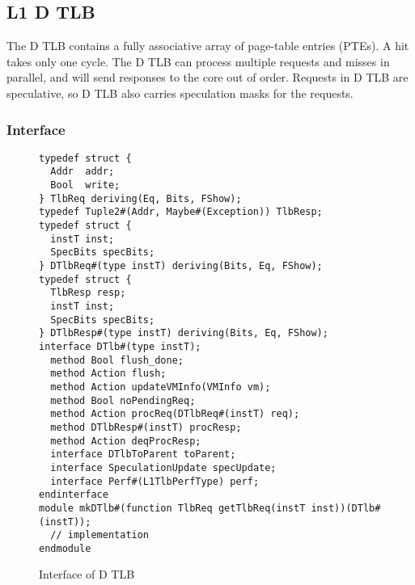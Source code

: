 \subsection{L1 D TLB}\label{sec:d-tlb}
The D TLB contains a fully associative array of page-table entries (PTEs).
A hit takes only one cycle.
The D TLB can process multiple requests and misses in parallel, and will send responses to the core out of order.
Requests in D TLB are speculative, so D TLB also carries speculation masks for the requests.

\subsubsection{Interface}

\begin{figure}
\begin{lstlisting}[caption={}]
typedef struct {
  Addr  addr;
  Bool  write;
} TlbReq deriving(Eq, Bits, FShow);
typedef Tuple2#(Addr, Maybe#(Exception)) TlbResp;
typedef struct {
  instT inst;
  SpecBits specBits;
} DTlbReq#(type instT) deriving(Bits, Eq, FShow);
typedef struct {
  TlbResp resp;
  instT inst;
  SpecBits specBits;
} DTlbResp#(type instT) deriving(Bits, Eq, FShow);
interface DTlb#(type instT);
  method Bool flush_done;
  method Action flush;
  method Action updateVMInfo(VMInfo vm);
  method Bool noPendingReq;
  method Action procReq(DTlbReq#(instT) req);
  method DTlbResp#(instT) procResp;
  method Action deqProcResp;
  interface DTlbToParent toParent;
  interface SpeculationUpdate specUpdate;
  interface Perf#(L1TlbPerfType) perf;
endinterface
module mkDTlb#(function TlbReq getTlbReq(instT inst))(DTlb#(instT));
  // implementation
endmodule
\end{lstlisting}
\caption{Interface of D TLB}\label{fig:d-tlb-ifc}
\end{figure}

